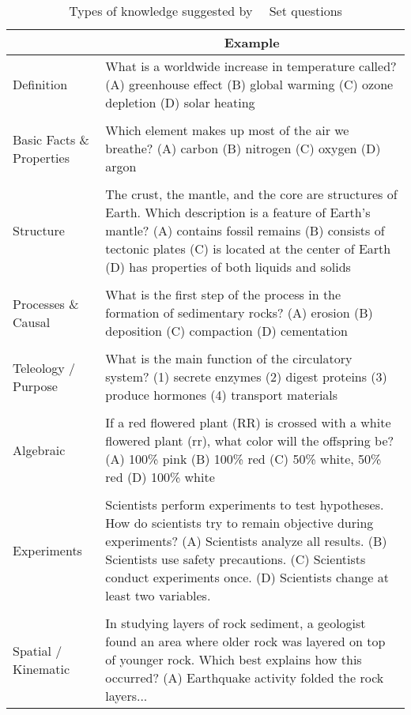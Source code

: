 \begin{table*}[htb]
\small
\centering
 \begin{tabular}{|>{\raggedright\arraybackslash}p{18ex}|p{80ex}|} \hline
{\bf Knowledge Type} \bigstrut[t] & \multicolumn{1}{c|}{\bf Example} \\ \hline
Definition \bigstrut[t] &
What is a worldwide increase in temperature called? (A) greenhouse effect (B) global warming (C) ozone depletion (D) solar heating \\
& \\
Basic Facts \& Properties &
Which element makes up most of the air we breathe? (A) carbon (B) nitrogen (C) oxygen (D) argon \\
& \\
Structure &
The crust, the mantle, and the core are structures of Earth. Which description is a feature of Earth's mantle? (A) contains fossil remains (B) consists of tectonic plates (C) is located at the center of Earth (D) has properties of both liquids and solids \\
& \\
Processes \& Causal & 
What is the first step of the process in the formation of sedimentary rocks? (A) erosion (B) deposition (C) compaction (D) cementation \\
 & \\
Teleology / Purpose
& What is the main function of the circulatory system? (1) secrete enzymes (2) digest proteins (3) produce hormones (4) transport materials \\
& \\
Algebraic &
If a red flowered plant (RR) is crossed with a white flowered plant (rr), what color will the offspring be? (A) 100\% pink (B) 100\% red (C) 50\% white, 50\% red (D) 100\% white \\
& \\
Experiments &
Scientists perform experiments to test hypotheses. How do scientists try to remain objective during experiments? (A) Scientists analyze all results. (B) Scientists use safety precautions. (C) Scientists conduct experiments once. (D) Scientists change at least two variables. \\
& \\
Spatial / Kinematic &
In studying layers of rock sediment, a geologist found an area where older rock was layered on top of younger rock. Which best explains how this occurred? (A) Earthquake activity folded the rock layers... \\ \hline
 \end{tabular}
\caption{Types of knowledge suggested by \ASC~\Challenge~Set questions}
\label{knowledge-types}
\end{table*}


